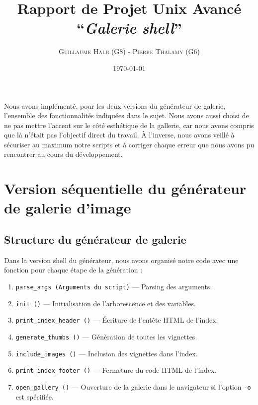 \documentclass[10.9pt]{article}
\title{Rapport de Projet Unix Avancé\\
  ``{\em Galerie shell}'' }
\author{\textsc{Guillaume Halb (G8)} - \textsc{Pierre Thalamy (G6)}}
\date{\today}
\begin{document}
\maketitle

Nous avons implémenté, pour les deux versions du générateur
de galerie, l'ensemble des fonctionnalités indiquées dans le
sujet. Nous avons aussi choisi de ne pas mettre l'accent sur le côté esthétique
de la gallerie, car
nous avons compris que là n'était pas l'objectif direct du travail. À
l'inverse, nous avons veillé à sécuriser au maximum notre scripts et
à corriger chaque erreur que nous avons pu rencontrer au cours du
développement. \\

\section{Version séquentielle du générateur de galerie d'image}

\subsection{Structure du générateur de galerie}

Dans la version shell du générateur, nous avons organisé notre code
avec une fonction pour chaque étape de la génération :
\begin{enumerate}
  \item \lstinline!parse_args (Arguments du script)! 
    –– Parsing des arguments.
  \item \lstinline!init ()! –– Initialisation de l'arborescence
    et des variables.
  \item \lstinline!print_index_header ()! –– Écriture de l'entête HTML de
    l'index.
  \item \lstinline!generate_thumbs ()! –– Génèration de toutes les vignettes.
  \item \lstinline!include_images ()! –– Inclusion des vignettes dans
    l'index.
  \item \lstinline!print_index_footer ()! –– Fermeture du code HTML de
    l'index.
  \item \lstinline!open_gallery ()! –– Ouverture de la galerie dans le
    navigateur si l'option \lstinline!-o! est spécifiée.
\end{enumerate}
\end{document}

